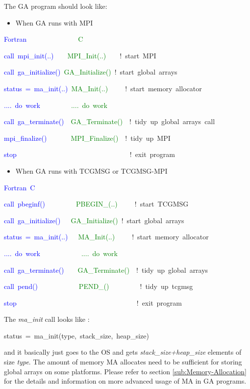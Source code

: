 The GA program should look like:
\begin{itemize}
\item When GA runs with MPI\end{itemize}
\begin{lyxcode}
\textcolor{blue}{Fortran~}~~~~~~~~~~~~~~\textcolor{green}{C}

\textcolor{blue}{call~mpi\_init(..)~}~~~\textcolor{green}{MPI\_Init(..)~}~~~!~start~MPI~

\textcolor{blue}{call~ga\_initialize()}~\textcolor{green}{GA\_Initialize()~}!~start~global~arrays~

\textcolor{blue}{status~=~ma\_init(..)}~\textcolor{green}{MA\_Init(..)~}~~~~!~start~memory~allocator

\textcolor{blue}{....~do~work~~}~~~~~~~\textcolor{green}{....~do~work}

\textcolor{blue}{call~ga\_terminate()}~~\textcolor{green}{GA\_Terminate()~}~!~tidy~up~global~arrays~call

\textcolor{blue}{mpi\_finalize()}~~~~~~~\textcolor{green}{MPI\_Finalize()}~~!~tidy~up~MPI~~

\textcolor{blue}{stop}~~~~~~~~~~~~~~~~~~~~~~~~~~~~~~~~~!~exit~program\end{lyxcode}
\begin{itemize}
\item When GA runs with TCGMSG or TCGMSG-MPI\end{itemize}
\begin{lyxcode}
\textcolor{blue}{Fortran~C}

\textcolor{blue}{call~pbeginf()~}~~~~~~~~\textcolor{green}{PBEGIN\_(..)~}~~~~!~start~TCGMSG~

\textcolor{blue}{call~ga\_initialize()}~~~\textcolor{green}{GA\_Initialize()}~!~start~global~arrays~

\textcolor{blue}{status~=~ma\_init(..)}~~~\textcolor{green}{MA\_Init(..)}~~~~~!~start~memory~allocator

\textcolor{blue}{....~do~work~}~~~~~~~~~~~\textcolor{green}{....~do~work}

\textcolor{blue}{call~ga\_terminate()}~~~~\textcolor{green}{GA\_Terminate()~}~!~tidy~up~global~arrays~

\textcolor{blue}{call~pend()}~~~~~~~~~~~~\textcolor{green}{PEND\_()}~~~~~~~~~!~tidy~up~tcgmsg~

\textcolor{blue}{stop~}~~~~~~~~~~~~~~~~~~~~~~~~~~~~~~~~~~!~exit~program~
\end{lyxcode}
The \emph{ma\_init }call looks like :
\begin{lyxcode}
status~=~ma\_init(type,~stack\_size,~heap\_size)
\end{lyxcode}
and it basically just goes to the OS and gets \emph{stack\_size+heap\_size}
elements of size \emph{type}. The amount of memory MA allocates need
to be sufficient for storing global arrays on some platforms. Please
refer to section \ref{sub:Memory-Allocation} for the details and
information on more advanced usage of MA in GA programs. 


